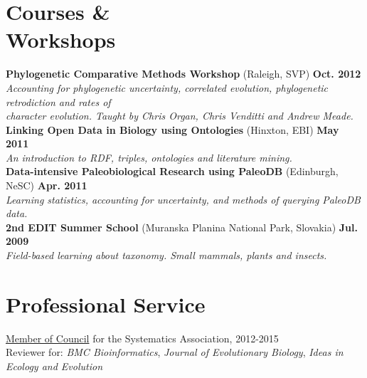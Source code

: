 \documentclass[margin,line]{resume}
\begin{document}
\begin{resume}
    \section{\mysidestyle Courses \& \\ Workshops} 
\textbf{Phylogenetic Comparative Methods Workshop} (Raleigh, SVP) \hfill \textbf{Oct. 2012}\\
    \textsl{Accounting for phylogenetic uncertainty, correlated evolution, phylogenetic retrodiction and rates of \\ character evolution. Taught by Chris Organ, Chris Venditti and Andrew Meade.}\\

\vspace{-7 mm} 
\textbf{Linking Open Data in Biology using Ontologies} (Hinxton, EBI)
 \hfill \textbf{May 2011}\\
    \textsl{An introduction to RDF, triples, ontologies and literature mining.}\\

\vspace{-7 mm} 
\textbf{Data-intensive Paleobiological Research using PaleoDB} (Edinburgh, NeSC)
 \hfill \textbf{Apr. 2011}\\
    \textsl{Learning statistics, accounting for uncertainty, and methods of querying PaleoDB data.}\\

\vspace{-7 mm} 
\textbf{2nd EDIT Summer School} (Muranska Planina National Park, Slovakia)
 \hfill \textbf{Jul. 2009}\\
    \textsl{Field-based learning about taxonomy. Small mammals, plants and insects.}\\

\vspace{-7 mm}  

    \section{\mysidestyle Professional Service} 

\href{http://www.systass.org/council/}{Member of Council} for the Systematics Association, 2012-2015 \\
Reviewer for: \textsl{BMC Bioinformatics}, \textsl{Journal of Evolutionary Biology}, \textsl{Ideas in Ecology and Evolution}\\


\end{resume}
\end{document}
